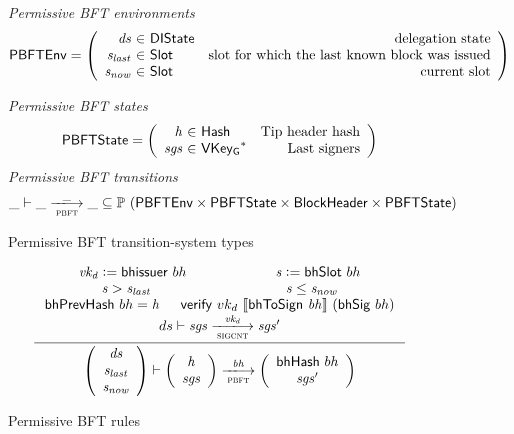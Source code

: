 \documentclass[11pt,a4paper]{article}
\newcommand{\powerset}[1]{\mathbb{P}~#1}
\newcommand{\var}[1]{\mathit{#1}}
\newcommand{\fun}[1]{\mathsf{#1}}
\newcommand{\type}[1]{\mathsf{#1}}
\newcommand{\trans}[2]{\xlongrightarrow[\textsc{#1}]{#2}}
\newcommand{\seqof}[1]{#1^{*}}
\newcommand{\serialised}[1]{\llbracket \var{#1} \rrbracket}
\newcommand{\leteq}{\ensuremath{\mathrel{\mathop:}=}}
\newcommand{\Hash}{\type{Hash}}  %
\newcommand{\Slot}{\type{Slot}}
\newcommand{\VKeyGen}{\type{VKey_G}}
\newcommand{\DelegState}{\type{DIState}}
\newcommand{\verifyname}{verify}
\newcommand{\bhsigname}{bhSig}
\newcommand{\bhissuername}{bhissuer}
\newcommand{\verify}[3]{\fun{\verifyname} ~ #1 ~ #2 ~ #3}
\newcommand{\bhsig}[1]{\fun{\bhsigname} ~ #1}
\newcommand{\bhissuer}[1]{\fun{\bhissuername} ~ #1}
\begin{document}
\begin{figure}[ht]
  \emph{Permissive BFT environments}
  \begin{equation*}
    \PBFTEnv =
    \left(
      \begin{array}{r@{~\in~}lr}
        \var{ds} & \DelegState & \text{delegation state} \\
        \var{s_{last}} & \Slot & \text{slot for which the last known block was issued} \\
        \var{s_{now}} & \Slot & \text{current slot} \\
      \end{array}
    \right)
  \end{equation*}

  \emph{Permissive BFT states}
  \begin{equation*}
    \PBFTState =
    \left(
      \begin{array}{r@{~\in~}lr}
        \var{h} & \Hash & \text{Tip header hash} \\
        \var{sgs} & \seqof{\VKeyGen} & \text{Last signers}
      \end{array}
    \right)
  \end{equation*}
  \emph{Permissive BFT transitions}
  \begin{equation*}
    \_ \vdash \var{\_} \trans{pbft}{\_} \var{\_} \subseteq
    \powerset (\PBFTEnv \times \PBFTState \times \Bhead \times \PBFTState)
  \end{equation*}
  \caption{Permissive BFT transition-system types}
  \label{fig:ts-types:pbft}
\end{figure}

\begin{figure}[ht]
  \begin{equation*}
    \inference
    {
      \var{vk_d} \leteq \bhissuer{bh} & \var{s} \leteq \bhslot{bh}
      \\ \var{s} > \var{s_{last}} & \var{s} \leq \var{s_{now}}
      \\ \bhprevhash{bh} = \var{h} & \verify{vk_d}{\serialised{\bhtosign{bh}}}{(\bhsig{bh})}
      \\
      ds
      \vdash
      \var{sgs} \trans{sigcnt}{\var{vk_d}} \var{sgs'}
      \\
    }
    {
      \left(
        {\begin{array}{c}
           \var{ds} \\
           \var{s_{last}} \\
           \var{s_{now}} \\
         \end{array}}
     \right)
     \vdash
     \left(
       {\begin{array}{c}
          \var{h} \\
          \var{sgs}
        \end{array}}
    \right)
    \trans{pbft}{\var{bh}}
    \left(
      {\begin{array}{c}
         \bhhash{bh} \\
         \var{sgs}'
       \end{array}}
   \right)
 }
\end{equation*}
\caption{Permissive BFT rules}
\label{fig:rules:pbft}
\end{figure}
\end{document}
